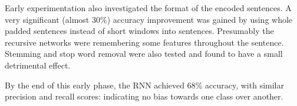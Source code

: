     Early experimentation also investigated the format of the encoded sentences.
    A very significant (almost 30\%) accuracy improvement was gained by using
    whole padded sentences instead of short windows into sentences. Presumably
    the recursive networks were remembering some features throughout the
    sentence. Stemming and stop word removal were also tested and found to have
    a small detrimental effect. 
    
    By the end of this early phase, the RNN achieved 68\% accuracy, with similar
    precision and recall scores: indicating no bias towards one class over
    another. 
    
   
